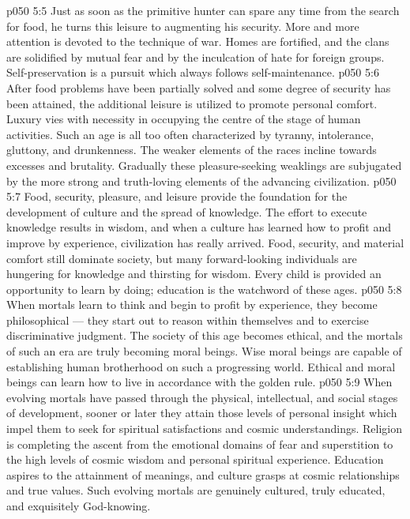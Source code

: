 \vs p050 5:5 \bibnobreakspace {} Just as soon as the primitive hunter can spare any time from the search for food, he turns this leisure to augmenting his security. More and more attention is devoted to the technique of war. Homes are fortified, and the clans are solidified by mutual fear and by the inculcation of hate for foreign groups. Self\hyp{}preservation is a pursuit which always follows self\hyp{}maintenance.
\vs p050 5:6 \bibnobreakspace {} After food problems have been partially solved and some degree of security has been attained, the additional leisure is utilized to promote personal comfort. Luxury vies with necessity in occupying the centre of the stage of human activities. Such an age is all too often characterized by tyranny, intolerance, gluttony, and drunkenness. The weaker elements of the races incline towards excesses and brutality. Gradually these pleasure\hyp{}seeking weaklings are subjugated by the more strong and truth\hyp{}loving elements of the advancing civilization.
\vs p050 5:7 \bibnobreakspace {} Food, security, pleasure, and leisure provide the foundation for the development of culture and the spread of knowledge. The effort to execute knowledge results in wisdom, and when a culture has learned how to profit and improve by experience, civilization has really arrived. Food, security, and material comfort still dominate society, but many forward\hyp{}looking individuals are hungering for knowledge and thirsting for wisdom. Every child is provided an opportunity to learn by doing; education is the watchword of these ages.
\vs p050 5:8 \bibnobreakspace {} When mortals learn to think and begin to profit by experience, they become philosophical --- they start out to reason within themselves and to exercise discriminative judgment. The society of this age becomes ethical, and the mortals of such an era are truly becoming moral beings. Wise moral beings are capable of establishing human brotherhood on such a progressing world. Ethical and moral beings can learn how to live in accordance with the golden rule.
\vs p050 5:9 \bibnobreakspace {} When evolving mortals have passed through the physical, intellectual, and social stages of development, sooner or later they attain those levels of personal insight which impel them to seek for spiritual satisfactions and cosmic understandings. Religion is completing the ascent from the emotional domains of fear and superstition to the high levels of cosmic wisdom and personal spiritual experience. Education aspires to the attainment of meanings, and culture grasps at cosmic relationships and true values. Such evolving mortals are genuinely cultured, truly educated, and exquisitely God\hyp{}knowing.
